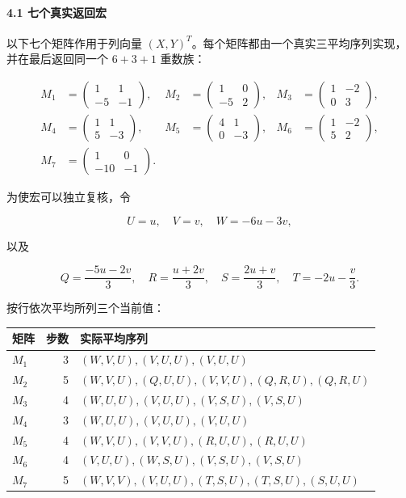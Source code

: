 \paragraph*{\texorpdfstring{{4.1} {七个真实返回宏}}{4.1 七个真实返回宏}}\label{C35-h237}

{以下七个矩阵作用于列向量} \((X,Y)^T\){。每个矩阵都由一个真实三平均序列实现，并在最后返回同一个} \(6+3+1\) {重数族：}

\[
\begin{aligned}
M_1&=\begin{pmatrix}1&1\\-5&-1\end{pmatrix},&
M_2&=\begin{pmatrix}1&0\\-5&2\end{pmatrix},&
M_3&=\begin{pmatrix}1&-2\\0&3\end{pmatrix},\\
M_4&=\begin{pmatrix}1&1\\5&-3\end{pmatrix},&
M_5&=\begin{pmatrix}4&1\\0&-3\end{pmatrix},&
M_6&=\begin{pmatrix}1&-2\\5&2\end{pmatrix},\\
M_7&=\begin{pmatrix}1&0\\-10&-1\end{pmatrix}.&&
\end{aligned}
\]

{为使宏可以独立复核，令}

\[
U=u,\quad V=v,\quad W=-6u-3v,
\]

{以及}

\[
Q=\frac{-5u-2v}{3},\quad
R=\frac{u+2v}{3},\quad
S=\frac{2u+v}{3},\quad
T=-2u-\frac v3.
\]

{按行依次平均所列三个当前值：}

{ %
\begin{longtable}[]{@{}lrl@{}}
\toprule\noalign{}
{矩阵} & {步数} & {实际平均序列} \\
\midrule\noalign{}
\endhead
\bottomrule\noalign{}
\endlastfoot
\(M_1\) & {3} & \((W,V,U),(V,U,U),(V,U,U)\) \\
\(M_2\) & {5} & \((W,V,U),(Q,U,U),(V,V,U),(Q,R,U),(Q,R,U)\) \\
\(M_3\) & {4} & \((W,U,U),(V,U,U),(V,S,U),(V,S,U)\) \\
\(M_4\) & {3} & \((W,U,U),(V,U,U),(V,U,U)\) \\
\(M_5\) & {4} & \((W,V,U),(V,V,U),(R,U,U),(R,U,U)\) \\
\(M_6\) & {4} & \((V,U,U),(W,S,U),(V,S,U),(V,S,U)\) \\
\(M_7\) & {5} & \((W,V,V),(V,U,U),(T,S,U),(T,S,U),(S,U,U)\) \\
\end{longtable}
}

